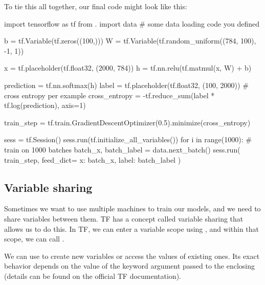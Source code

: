 To tie this all together, our final code might look like this:
\begin{python}
import tensorflow as tf
from . import data  # some data loading code you defined

b = tf.Variable(tf.zeros((100,)))
W = tf.Variable(tf.random_uniform((784, 100), -1, 1))

x = tf.placeholder(tf.float32, (2000, 784))
h = tf.nn.relu(tf.matmul(x, W) + b)

prediction = tf.nn.softmax(h)
label = tf.placeholder(tf.float32, (100, 2000))
# cross entropy per example
cross_entropy = -tf.reduce_sum(label * tf.log(prediction), axis=1)

train_step = tf.train.GradientDescentOptimizer(0.5).minimize(cross_entropy)

sess = tf.Session()
sess.run(tf.initialize_all_variables())
for i in range(1000):  # train on 1000 batches
    batch_x, batch_label = data.next_batch()
    sess.run(
        train_step, 
        feed_dict={
            x: batch_x,
            label: batch_label
        }
    )
\end{python}

\subsection{Variable sharing}
Sometimes we want to use multiple machines to train our models, and we need to share variables between them. TF has a concept called variable sharing that allows us to do this. In TF, we can enter a variable scope using , and within that scope, we can call .

We can use  to create new variables or access the values of existing ones. Its exact behavior depends on the value of the  keyword argument passed to the enclosing  (details can be found on the official TF documentation).
